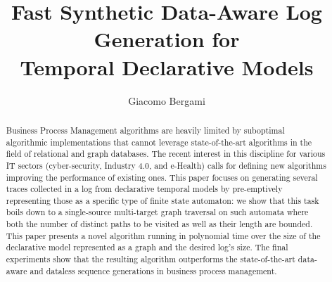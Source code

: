 \documentclass[sigconf]{acmart}
\begin{document}


	\title[Fast Synthetic Data-Aware Log Generation for Temporal Declarative Models]{Fast Synthetic Data-Aware Log Generation for\\ Temporal Declarative Models}

\author{Giacomo Bergami}



	\renewcommand{\shortauthors}{Giacomo Bergami}

\begin{abstract}
Business Process Management algorithms are heavily limited by suboptimal algorithmic implementations that cannot leverage state-of-the-art algorithms in the field of relational and graph databases. The recent interest in this discipline for various IT sectors (cyber-security, Industry 4.0, and e-Health) calls for defining new algorithms  improving the performance of existing ones. This paper focuses on generating several traces collected in a log from declarative temporal models by pre-emptively representing those as a specific type of finite state automaton: we show that this task boils down to a single-source multi-target graph traversal on such automata where both the number of distinct paths to be visited as well as their length are bounded. This paper presents a novel algorithm running in polynomial time over the size of the declarative model represented as a graph and the desired log's size. The final experiments show that the resulting algorithm outperforms the state-of-the-art data-aware and dataless sequence generations in business process management.
\end{abstract}
\end{document}
